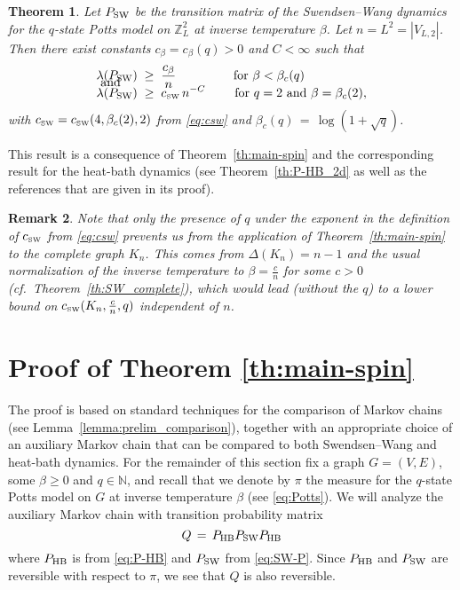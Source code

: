 \documentclass{dis}
\newtheorem{theorem}{Theorem}[chapter]
\newtheorem{remark}[theorem]{Remark}
\theoremstyle{citing}
\begin{document}
\vspace{2mm}
\begin{theorem}\label{th:P-SW_2d_high}
Let ${P_{\rm SW}}$ be the transition matrix of the Swendsen--Wang dynamics for 
the $q$-state Potts model on ${\ensuremath{\mathbb{Z}}}_L^2$ at inverse temperature $\beta$. 
Let $n=L^2={\left\vert {V_{L,2}} \right\vert}$. Then there exist constants 
$c_{\beta}=c_\beta(q)>0$ and $C<\infty$ 
such that
\begin{align*}
\lambda({P_{\rm SW}}) \;&\ge\; \frac{c_\beta}{n} \qquad\qquad\; 
	\text{ for } \beta < \beta_c(q) \\[-5mm]
\intertext{\vspace*{-3mm} and}
\lambda({P_{\rm SW}}) \;&\ge\; {c_{\text{\rm\tiny SW}}}\,n^{-C} \qquad 	
	\text{ for } q=2 \text{ and } \beta = \beta_c(2),
\end{align*}
with ${c_{\text{\rm\tiny SW}}}={c_{\text{\rm\tiny SW}}}(4,\beta_c(2),2)$ from \eqref{eq:csw} 
and $\beta_c(q)\,=\,\log(1+\sqrt{q})$. 
\end{theorem}

This result is a consequence of Theorem~\ref{th:main-spin} and the 
corresponding result for the heat-bath dynamics (see 
Theorem~\ref{th:P-HB_2d} as well as the references that are given 
in its proof). 

\begin{remark}
Note that only the presence of $q$ under the exponent in the 
definition of ${c_{\text{\rm\tiny SW}}}$ from \eqref{eq:csw} 
prevents us from the application of Theorem~\ref{th:main-spin} 
to the complete graph $K_n$.
This comes from ${\Delta}(K_n)=n-1$ and the usual normalization of 
the inverse temperature to $\beta=\frac{c}{n}$ for some $c>0$ 
(cf.~Theorem~\ref{th:SW_complete}), which 
would lead (without the $q$) to a lower bound on 
${c_{\text{\rm\tiny SW}}}(K_n,\frac{c}{n},q)$ independent of $n$.
\end{remark}

\section[Proof of Theorem \ref*{th:main-spin}]
{Proof of Theorem \ref{th:main-spin}} \label{sec:3_proof}

The proof is based on standard techniques 
for the comparison of Markov chains (see 
Lemma~\ref{lemma:prelim_comparison}), together with an appropriate 
choice of an auxiliary Markov chain that can be compared to 
both Swendsen--Wang and heat-bath dynamics.
For the remainder of this section fix a graph $G=(V,E)$, some $\beta\ge0$ and 
$q\in{\ensuremath{\mathbb{N}}}$, and recall that we denote by $\pi$ the measure for 
the $q$-state Potts model on $G$ at inverse temperature $\beta$ 
(see \eqref{eq:Potts}).
We will analyze the auxiliary Markov chain with transition 
probability matrix 
\begin{equation}\label{eq:Q}
Q \,=\, {P_{\rm HB}} {P_{\rm SW}} {P_{\rm HB}}
\end{equation}
where ${P_{\rm HB}}$ is from \eqref{eq:P-HB} and ${P_{\rm SW}}$ from \eqref{eq:SW-P}. 
Since ${P_{\rm HB}}$ and ${P_{\rm SW}}$ are reversible with respect to $\pi$, we see that 
$Q$ is also reversible. 
\end{document}
